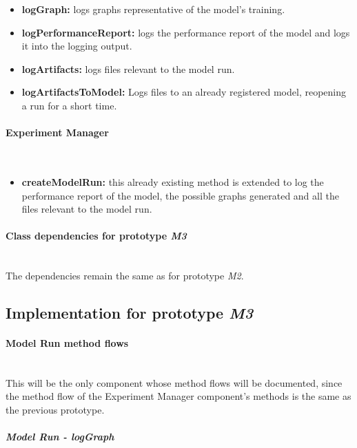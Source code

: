 \begin{itemize}
    \item \textbf{logGraph: }logs graphs representative of the model's training.
    \item \textbf{logPerformanceReport: } logs the performance report of the model and logs it into the logging output.
    \item \textbf{logArtifacts: }logs files relevant to the model run.
    \item \textbf{logArtifactsToModel: }Logs files to an already registered model, reopening a run for a short time.
\end{itemize}

\paragraph{Experiment Manager} \mbox{} \\

\begin{itemize}
    \item \textbf{createModelRun: }this already existing method is extended to log the performance report of the model, the possible graphs generated and all the files relevant to the model run.
\end{itemize}

\paragraph{Class dependencies for prototype \emph{M3}} \mbox{} \\

The dependencies remain the same as for prototype \emph{M2}.

\subsection{Implementation for prototype \emph{M3}}

\paragraph{Model Run method flows} \mbox{}\\

This will be the only component whose method flows will be documented, since the method flow of the Experiment Manager component's methods is the same as the previous prototype.

\subparagraph{Model Run - logGraph} \mbox{}\\

